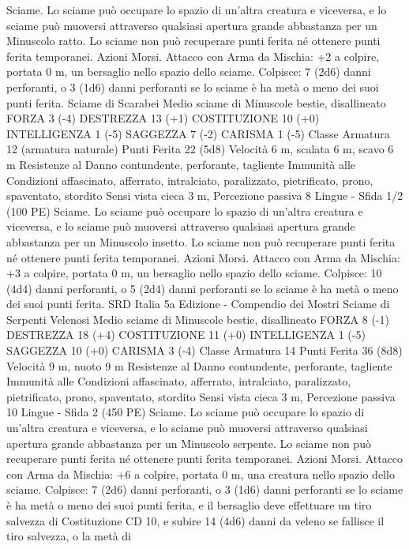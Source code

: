 \begin{multicols}{2}
Sciame. Lo sciame può occupare lo spazio di un’altra creatura e
viceversa, e lo sciame può muoversi attraverso qualsiasi apertura
grande abbastanza per un Minuscolo ratto. Lo sciame non può
recuperare punti ferita né ottenere punti ferita temporanei.
Azioni
Morsi. Attacco con Arma da Mischia: +2 a colpire, portata 0 m,
un bersaglio nello spazio dello sciame.
Colpisce: 7 (2d6) danni perforanti, o 3 (1d6) danni perforanti se
lo sciame è ha metà o meno dei suoi punti ferita.
Sciame di Scarabei
Medio sciame di Minuscole bestie, disallineato
FORZA 3 (-4)
DESTREZZA 13 (+1)
COSTITUZIONE 10 (+0)
INTELLIGENZA 1 (-5)
SAGGEZZA 7 (-2)
CARISMA 1 (-5)
Classe Armatura 12 (armatura naturale)
Punti Ferita 22 (5d8)
Velocità 6 m, scalata 6 m, scavo 6 m
Resistenze al Danno contundente, perforante, tagliente
Immunità alle Condizioni affascinato, afferrato, intralciato,
paralizzato, pietrificato, prono, spaventato, stordito
Sensi vista cieca 3 m, Percezione passiva 8
Lingue -
Sfida 1/2 (100 PE)
Sciame. Lo sciame può occupare lo spazio di un’altra creatura e
viceversa, e lo sciame può muoversi attraverso qualsiasi apertura
grande abbastanza per un Minuscolo insetto. Lo sciame non può
recuperare punti ferita né ottenere punti ferita temporanei.
Azioni
Morsi. Attacco con Arma da Mischia: +3 a colpire, portata 0 m,
un bersaglio nello spazio dello sciame.
Colpisce: 10 (4d4) danni perforanti, o 5 (2d4) danni perforanti se
lo sciame è ha metà o meno dei suoi punti ferita.
SRD Italia 5a Edizione - Compendio dei Mostri
Sciame di Serpenti Velenosi
Medio sciame di Minuscole bestie, disallineato
FORZA 8 (-1)
DESTREZZA 18 (+4)
COSTITUZIONE 11 (+0)
INTELLIGENZA 1 (-5)
SAGGEZZA 10 (+0)
CARISMA 3 (-4)
Classe Armatura 14
Punti Ferita 36 (8d8)
Velocità 9 m, nuoto 9 m
Resistenze al Danno contundente, perforante, tagliente
Immunità alle Condizioni affascinato, afferrato, intralciato,
paralizzato, pietrificato, prono, spaventato, stordito
Sensi vista cieca 3 m, Percezione passiva 10
Lingue -
Sfida 2 (450 PE)
Sciame. Lo sciame può occupare lo spazio di un’altra creatura e
viceversa, e lo sciame può muoversi attraverso qualsiasi apertura
grande abbastanza per un Minuscolo serpente. Lo sciame non
può recuperare punti ferita né ottenere punti ferita temporanei.
Azioni
Morsi. Attacco con Arma da Mischia: +6 a colpire, portata 0 m,
una creatura nello spazio dello sciame.
Colpisce: 7 (2d6) danni perforanti, o 3 (1d6) danni perforanti se
lo sciame è ha metà o meno dei suoi punti ferita, e il bersaglio
deve effettuare un tiro salvezza di Costituzione CD 10, e subire
14 (4d6) danni da veleno se fallisce il tiro salvezza, o la metà di

\end{multicols}
